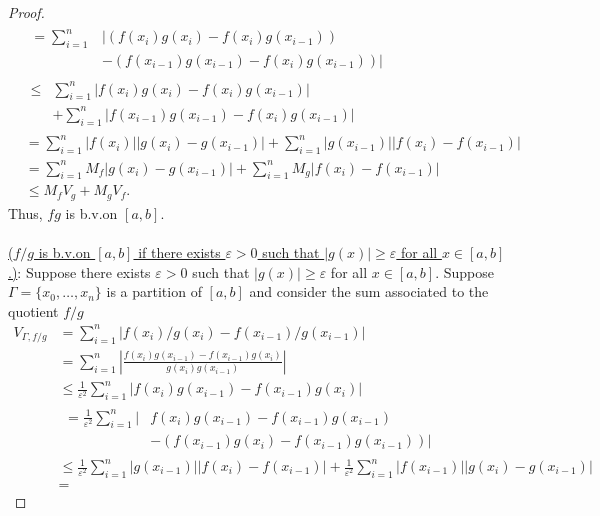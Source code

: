 \begin{proof}
\begin{equation}
\begin{aligned}
      &\begin{aligned}
        =\sum_{i=1}^n
        &\left|(f(x_i)g(x_i)-f(x_i)g(x_{i-1}))\right.\\
        &\left.-(f(x_{i-1})g(x_{i-1})-f(x_i)g(x_{i-1}))\right|
      \end{aligned}\\
      &\begin{aligned}
        \leq&\sum_{i=1}^n|f(x_i)g(x_i)-f(x_i)g(x_{i-1})|\\
        &+\sum_{i=1}^n|f(x_{i-1})g(x_{i-1})-f(x_i)g(x_{i-1})|
      \end{aligned}\\
      &=\sum_{i=1}^n|f(x_i)||g(x_i)-g(x_{i-1})|+\sum_{i=1}^n|g(x_{i-1})||f(x_i)-f(x_{i-1})|\\
      &=\sum_{i=1}^n
      M_f|g(x_i)-g(x_{i-1})|+\sum_{i=1}^nM_g|f(x_i)-f(x_{i-1})|\\
      &\leq M_fV_g+M_gV_f.
      \end{aligned}
    \end{equation}
    Thus, $fg$ is b.v.\@ on $[a,b]$.
    \\\\
    \underline{($f/g$ is b.v.\@ on $[a,b]$ if there exists $\varepsilon>0$
      such that $|g(x)|\geq\varepsilon$ for all $x\in[a,b]$.)}: Suppose
    there exists $\varepsilon>0$ such that $|g(x)|\geq\varepsilon$ for all
    $x\in[a,b]$. Suppose $\Gamma=\{x_0,\dotsc,x_n\}$ is a partition of
    $[a,b]$ and consider the sum associated to the quotient $f/g$
    \begin{equation}
      \label{eq:1:7}
      \begin{aligned}
        V_{\Gamma,f/g}
        &=\sum_{i=1}^n |f(x_i)/g(x_i)-f(x_{i-1})/g(x_{i-1})|\\
        &=\sum_{i=1}^n\left|\frac{f(x_i)g(x_{i-1})-
            f(x_{i-1})g(x_i)}{g(x_i)g(x_{i-1})}\right|\\
        &\leq\frac{1}{\varepsilon^2}\sum_{i=1}^n|f(x_i)g(x_{i-1})-f(x_{i-1})g(x_i)|\\
        &
        \begin{aligned}
          =\frac{1}{\varepsilon^2}\sum_{i=1}^n |&f(x_i)g(x_{i-1})-f(x_{i-1})g(x_{i-1})\\
          &-(f(x_{i-1})g(x_i)-f(x_{i-1})g(x_{i-1}))|
        \end{aligned}\\
        &\leq
        \frac{1}{\varepsilon^2}\sum_{i=1}^n|g(x_{i-1})||f(x_i)-f(x_{i-1})|
        +\frac{1}{\varepsilon^2}\sum_{i=1}^n|f(x_{i-1})||g(x_i)-g(x_{i-1})|\\
        &=
      \end{aligned}
    \end{equation}

\end{proof}

